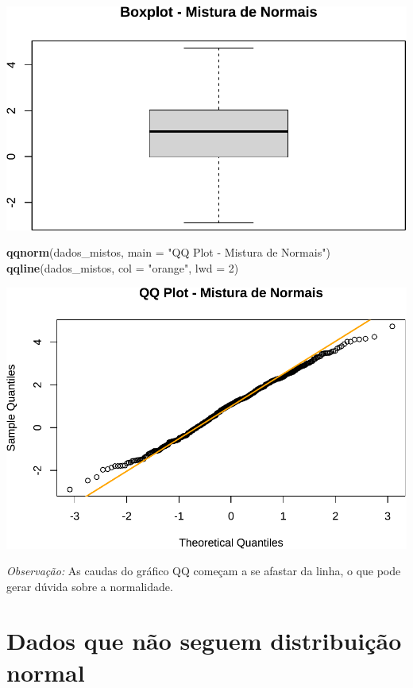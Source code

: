 \documentclass[
]{book}
\newenvironment{Shaded}{\begin{snugshade}}{\end{snugshade}}
\newcommand{\AttributeTok}[1]{\textcolor[rgb]{0.13,0.29,0.53}{#1}}
\newcommand{\DecValTok}[1]{\textcolor[rgb]{0.00,0.00,0.81}{#1}}
\newcommand{\FunctionTok}[1]{\textcolor[rgb]{0.13,0.29,0.53}{\textbf{#1}}}
\newcommand{\NormalTok}[1]{#1}
\newcommand{\StringTok}[1]{\textcolor[rgb]{0.31,0.60,0.02}{#1}}
\begin{document}
\includegraphics{Livro-Estatistica+R_files/figure-latex/duvidosa-2.pdf}

\begin{Shaded}
\begin{Highlighting}[]
\FunctionTok{qqnorm}\NormalTok{(dados\_mistos, }\AttributeTok{main =} \StringTok{"QQ Plot {-} Mistura de Normais"}\NormalTok{)}
\FunctionTok{qqline}\NormalTok{(dados\_mistos, }\AttributeTok{col =} \StringTok{"orange"}\NormalTok{, }\AttributeTok{lwd =} \DecValTok{2}\NormalTok{)}
\end{Highlighting}
\end{Shaded}

\includegraphics{Livro-Estatistica+R_files/figure-latex/duvidosa-3.pdf}

\emph{Observação:} As caudas do gráfico QQ começam a se afastar da linha, o que pode gerar dúvida sobre a normalidade.

\section{Dados que não seguem distribuição normal}\label{dados-que-nuxe3o-seguem-distribuiuxe7uxe3o-normal}
\end{document}
